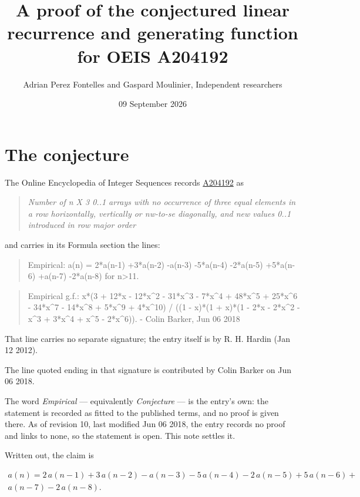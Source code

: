\documentclass[11pt]{article}
\title{A proof of the conjectured linear recurrence and generating function for OEIS A204192}
\author{Adrian Perez Fontelles and Gaspard Moulinier, Independent researchers}
\date{09 September 2026}
\theoremstyle{definition}
\begin{document}
\maketitle
\section{The conjecture}

The Online Encyclopedia of Integer Sequences records \href{https://oeis.org/A204192}{A204192} as

\begin{quote}\itshape Number of n X 3 0..1 arrays with no occurrence of three equal elements in a row horizontally, vertically or nw-to-se diagonally, and new values 0..1 introduced in row major order\end{quote}

and carries in its Formula section the lines:

\begin{quote}\ttfamily Empirical: a(n) = 2*a(n-1) +3*a(n-2) -a(n-3) -5*a(n-4) -2*a(n-5) +5*a(n-6) +a(n-7) -2*a(n-8) for n>11.\end{quote}

\begin{quote}\ttfamily Empirical g.f.: x*(3 + 12*x - 12*x\textasciicircum{}2 - 31*x\textasciicircum{}3 - 7*x\textasciicircum{}4 + 48*x\textasciicircum{}5 + 25*x\textasciicircum{}6 - 34*x\textasciicircum{}7 - 14*x\textasciicircum{}8 + 5*x\textasciicircum{}9 + 4*x\textasciicircum{}10) / ((1 - x)*(1 + x)*(1 - 2*x - 2*x\textasciicircum{}2 - x\textasciicircum{}3 + 3*x\textasciicircum{}4 + x\textasciicircum{}5 - 2*x\textasciicircum{}6)). - Colin Barker, Jun 06 2018\end{quote}

That line carries no separate signature; the entry itself is by R. H. Hardin (Jan 12 2012).

The line quoted ending in that signature is contributed by Colin Barker on Jun 06 2018.

The word {\itshape Empirical} --- equivalently {\itshape Conjecture} --- is the entry's own: the statement is recorded as fitted to the published terms, and no proof is given there. As of revision 10, last modified Jun 06 2018, the entry records no proof and links to none, so the statement is open. This note settles it.

Written out, the claim is

\begin{multline*} a(n) = 2\,a(n-1) + 3\,a(n-2) - a(n-3) - 5\,a(n-4) - 2\,a(n-5) + 5\,a(n-6) + \\ a(n-7) - 2\,a(n-8). \end{multline*}
\end{document}
